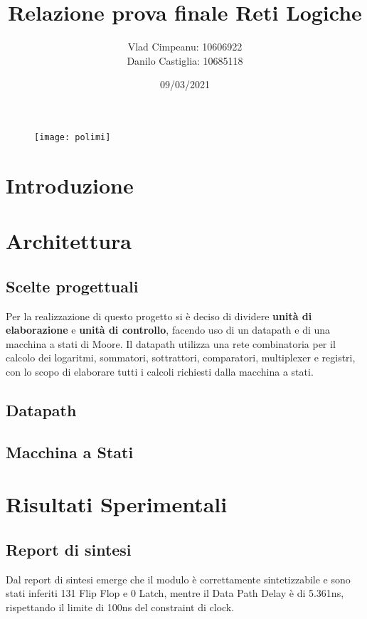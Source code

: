 \documentclass{article}
\title{Relazione prova finale Reti Logiche}
\date{09/03/2021}
\author{Vlad Cimpeanu: 10606922\\ Danilo Castiglia: 10685118}
\begin{document}
\maketitle
{}


\begin{figure}[h!] %
\centering
  \texttt{[image: polimi]}
  \label{fig:polimi}
\end{figure}

\newpage

\section{Introduzione}


\section{Architettura}
\subsection{Scelte progettuali}
Per la realizzazione di questo progetto si è deciso di dividere \textbf{unità di elaborazione} e \textbf{unità di controllo}, facendo uso di un datapath e di una macchina a stati di Moore. Il datapath utilizza una rete combinatoria per il calcolo dei logaritmi, sommatori, sottrattori, comparatori, multiplexer e registri, con lo scopo di elaborare tutti i calcoli richiesti dalla macchina a stati.

\subsection{Datapath}

\subsection{Macchina a Stati}



%

\section{Risultati Sperimentali}
\subsection{Report di sintesi}
Dal report di sintesi emerge che il modulo è correttamente sintetizzabile e sono stati inferiti 131 Flip Flop e 0 Latch, mentre il Data Path Delay è di 5.361ns, rispettando il limite di 100ns del constraint di clock.
\end{document}
